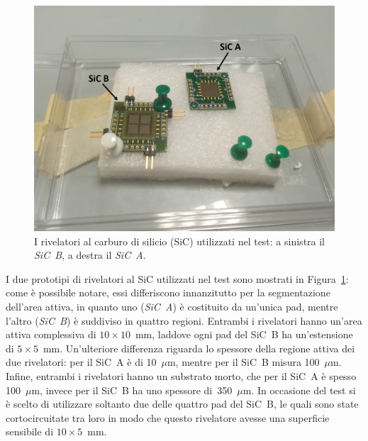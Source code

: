 \begin{figure} [!p]
	\centering
	\includegraphics[width=\textwidth, keepaspectratio]{Grafici/sic_etichette.png}
	\caption{I rivelatori al carburo di silicio (SiC) utilizzati nel test: a sinistra il \emph{SiC~B}, a destra il \emph{SiC~A}.} \label{fig:sic}
\end{figure}

I due prototipi di rivelatori al SiC utilizzati nel test sono mostrati in Figura~\ref{fig:sic}: come è possibile notare, essi differiscono innanzitutto per la segmentazione dell'area attiva, in quanto uno (\emph{SiC~A}) è costituito da un'unica pad, mentre l'altro (\emph{SiC~B}) è suddiviso in quattro regioni. 
Entrambi i rivelatori hanno un'area attiva complessiva di $10 \times 10$~mm, laddove ogni pad del SiC~B ha un'estensione di $5 \times 5$~mm.
Un'ulteriore differenza riguarda lo spessore della regione attiva dei due rivelatori: per il SiC~A è di 10~$\mu$m, mentre per il SiC~B misura 100~$\mu$m.
Infine, entrambi i rivelatori hanno un substrato morto, che per il SiC~A è spesso 100~$\mu$m, invece per il SiC~B ha uno spessore di~350~$\mu$m.
In occasione del test si è scelto di utilizzare soltanto due delle quattro pad del SiC~B, le quali sono state cortocircuitate tra loro in modo che questo rivelatore avesse una superficie sensibile di $10 \times 5$~mm.






